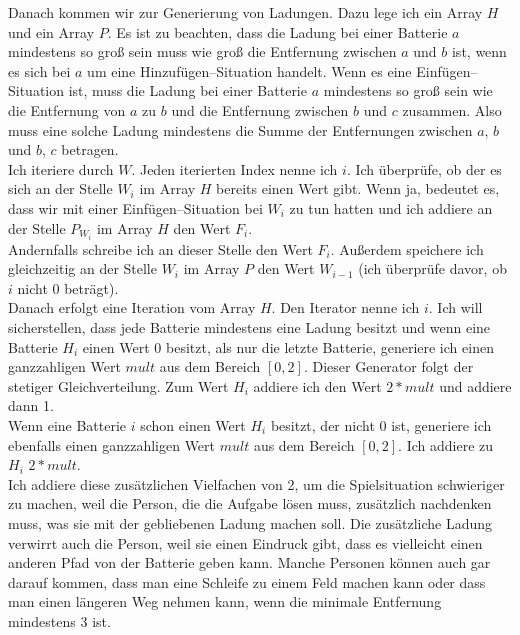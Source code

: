 \documentclass[a4paper,10pt,ngerman]{scrartcl}
\begin{document}
Danach kommen wir zur Generierung von Ladungen. Dazu lege ich ein Array $H$ und ein Array $P$.
Es ist zu beachten, dass die Ladung bei einer Batterie $a$ mindestens so groß sein muss wie groß
die Entfernung zwischen $a$ und $b$ ist, wenn es sich bei $a$ um eine Hinzufügen--Situation handelt.
Wenn es eine Einfügen--Situation ist, muss die Ladung bei einer Batterie $a$ mindestens so groß sein wie
die Entfernung von $a$ zu $b$ und die Entfernung zwischen $b$ und $c$ zusammen. Also muss eine
solche Ladung mindestens die Summe der Entfernungen zwischen $a$, $b$ und $b$, $c$ betragen.\\
Ich iteriere durch $W$. Jeden iterierten Index nenne ich $i$.
Ich überprüfe, ob der es sich an der Stelle $W_i$ im Array $H$ bereits einen Wert gibt.
Wenn ja, bedeutet es, dass wir mit einer Einfügen--Situation bei $W_i$ zu tun hatten und ich
addiere an der Stelle $P_{W_i}$ im Array $H$ den Wert $F_i$.\\
Andernfalls schreibe ich an dieser Stelle den Wert $F_i$. Außerdem speichere ich gleichzeitig 
an der Stelle $W_i$ im Array $P$ den Wert $W_{i-1}$ (ich überprüfe davor, ob $i$ nicht 0 beträgt).\\
Danach erfolgt eine Iteration vom Array $H$. Den Iterator nenne ich $i$.
Ich will sicherstellen, dass jede Batterie mindestens eine Ladung
besitzt und wenn eine Batterie $H_i$ einen Wert 0 besitzt, als nur die letzte Batterie,
generiere ich einen ganzzahligen Wert $mult$ aus dem Bereich $[0,2]$.
Dieser Generator folgt der stetiger Gleichverteilung.
Zum Wert $H_i$ addiere ich den Wert $2*mult$ und addiere dann 1.\\
Wenn eine Batterie $i$ schon einen Wert $H_i$ besitzt, der nicht 0 ist, generiere ich ebenfalls
einen ganzzahligen Wert $mult$ aus dem Bereich $[0,2]$.
Ich addiere zu $H_i$ $2*mult$.\\
Ich addiere diese zusätzlichen Vielfachen von 2, um die Spielsituation schwieriger zu machen, weil
die Person, die die Aufgabe lösen muss, zusätzlich nachdenken muss, was sie mit der gebliebenen
Ladung machen soll.
Die zusätzliche Ladung verwirrt auch die Person, weil sie einen Eindruck gibt, dass es vielleicht einen anderen
Pfad von der Batterie geben kann. Manche Personen können auch gar darauf kommen, dass man eine Schleife
zu einem Feld machen kann oder dass man einen längeren Weg nehmen kann, wenn die minimale Entfernung mindestens 3 ist.
\end{document}
